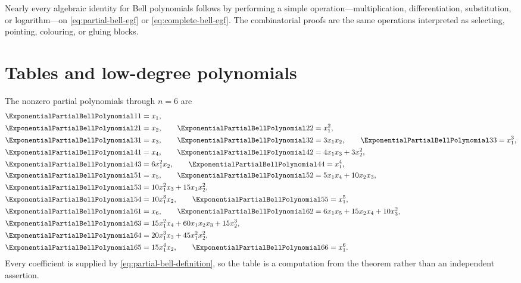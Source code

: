 \documentclass[11pt,a4paper,oneside,openany]{book}
\theoremstyle{definition}
\theoremstyle{remark}
\begin{document}
\begin{masterbox}
Nearly every algebraic identity for Bell polynomials follows by performing a simple
operation---multiplication, differentiation, substitution, or logarithm---on
\eqref{eq:partial-bell-egf} or \eqref{eq:complete-bell-egf}.  The combinatorial
proofs are the same operations interpreted as selecting, pointing, colouring, or
gluing blocks.
\end{masterbox}

\section{Tables and low-degree polynomials}
The nonzero partial polynomials through $n=6$ are
\begin{align*}
\ExponentialPartialBellPolynomial11&=x_1,\\
\ExponentialPartialBellPolynomial21&=x_2,\qquad \ExponentialPartialBellPolynomial22=x_1^2,\\
\ExponentialPartialBellPolynomial31&=x_3,\qquad \ExponentialPartialBellPolynomial32=3x_1x_2,\qquad \ExponentialPartialBellPolynomial33=x_1^3,\\
\ExponentialPartialBellPolynomial41&=x_4,\qquad \ExponentialPartialBellPolynomial42=4x_1x_3+3x_2^2,\\
\ExponentialPartialBellPolynomial43&=6x_1^2x_2,\qquad \ExponentialPartialBellPolynomial44=x_1^4,\\
\ExponentialPartialBellPolynomial51&=x_5,\qquad \ExponentialPartialBellPolynomial52=5x_1x_4+10x_2x_3,\\
\ExponentialPartialBellPolynomial53&=10x_1^2x_3+15x_1x_2^2,\\
\ExponentialPartialBellPolynomial54&=10x_1^3x_2,\qquad \ExponentialPartialBellPolynomial55=x_1^5,\\
\ExponentialPartialBellPolynomial61&=x_6,\qquad \ExponentialPartialBellPolynomial62=6x_1x_5+15x_2x_4+10x_3^2,\\
\ExponentialPartialBellPolynomial63&=15x_1^2x_4+60x_1x_2x_3+15x_2^3,\\
\ExponentialPartialBellPolynomial64&=20x_1^3x_3+45x_1^2x_2^2,\\
\ExponentialPartialBellPolynomial65&=15x_1^4x_2,\qquad \ExponentialPartialBellPolynomial66=x_1^6.
\end{align*}
Every coefficient is supplied by \eqref{eq:partial-bell-definition}, so the table
is a computation from the theorem rather than an independent assertion.
\end{document}
